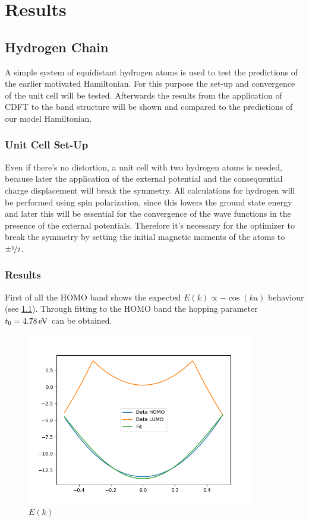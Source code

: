 \chapter{Results}
\section{Hydrogen Chain}

A simple system of equidistant hydrogen atoms is used to test the predictions of the earlier motivated Hamiltonian. For this purpose the set-up and convergence of the unit cell will be tested. Afterwards the results from the application of CDFT to the band structure will be shown and compared to the predictions of our model Hamiltonian.

\subsection{Unit Cell Set-Up}
Even if there's no distortion, a unit cell with two hydrogen atoms is needed, because later the application of the external potential and the consequential charge displacement will break the symmetry. All calculations for hydrogen will be performed using spin polarization, since this lowers the ground state energy and later this will be essential for the convergence of the wave functions in the presence of the external potentials. Therefore it's necessary for the optimizer to break the symmetry by setting the initial magnetic moments of the atoms to $\pm\nicefrac{1}{2}$. 


\subsection{Results}

First of all the HOMO band shows the expected $E(k)\propto -\cos(ka)$ behaviour (see \cref{image_hydrogen_bandstructure}). Through fitting to the HOMO band the hopping parameter $t_0 = \unit[4.78]{eV}$ can be obtained.

\begin{figure}[!bth]
	\centering
	\includegraphics[width = 10cm]{Images/Hydrogen/hydrogen_bandstructure}
	\caption{$E(k)$}
	\label{image_hydrogen_bandstructure}
\end{figure}

